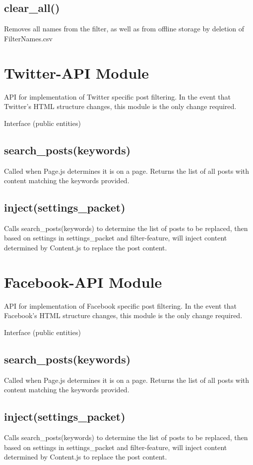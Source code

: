 \documentclass[12pt, titlepage]{article}
\begin{document}
\subsection{clear\_all()}
Removes all names from the filter, as well as from offline storage by deletion of FilterNames.csv

\section{Twitter-API Module}
API for implementation of Twitter specific post filtering. In the event that Twitter's HTML structure changes, this module is the only change required.

Interface (public entities)
\subsection{search\_posts(keywords)}
Called when Page.js determines it is on a page. Returns the list of all posts with content matching the keywords provided.
\subsection{inject(settings\_packet)}
Calls search\_posts(keywords) to determine the list of posts to be replaced, then based on settings in settings\_packet and filter-feature, will inject content determined by Content.js to replace the post content.

\section{Facebook-API Module}
API for implementation of Facebook specific post filtering. In the event that Facebook's HTML structure changes, this module is the only change required.

Interface (public entities)
\subsection{search\_posts(keywords)}
Called when Page.js determines it is on a page. Returns the list of all posts with content matching the keywords provided.
\subsection{inject(settings\_packet)}
Calls search\_posts(keywords) to determine the list of posts to be replaced, then based on settings in settings\_packet and filter-feature, will inject content determined by Content.js to replace the post content.
\end{document}
